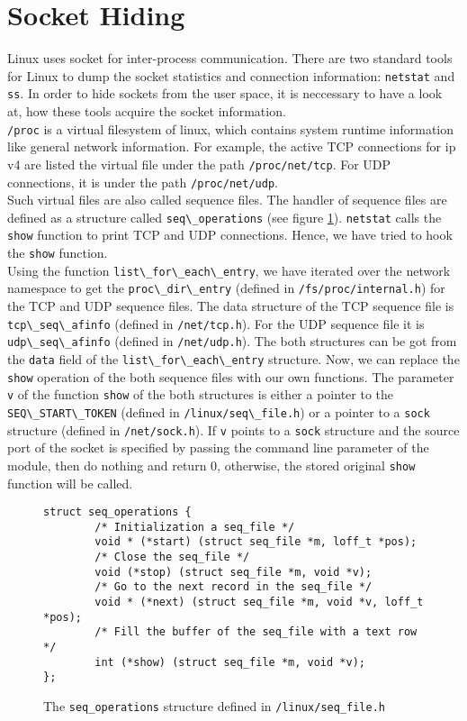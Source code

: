 \section{Socket Hiding}
Linux uses socket for inter-process communication. There are two standard tools for Linux to dump the socket statistics and connection information: \texttt{netstat} and \texttt{ss}. In order to hide sockets from the user space, it is neccessary to have a look at, how these tools acquire the socket information. \\
\verb+/proc+ is a virtual filesystem of linux, which contains system runtime information like general network information. For example, the active TCP connections for ip v4 are listed the virtual file under the path \verb+/proc/net/tcp+. For UDP connections, it is under the path \verb+/proc/net/udp+.\\
Such virtual files are also called sequence files. The handler of sequence files are defined as a structure called \verb+seq\_operations+ (see figure \ref{ls:op}). \verb+netstat+ calls the \verb+show+ function to print TCP and UDP connections. Hence, we have tried to hook the \verb+show+ function.\\
Using the function \verb+list\_for\_each\_entry+, we have iterated over the network namespace to get the \verb+proc\_dir\_entry+ (defined in \verb+/fs/proc/internal.h+) for the TCP and UDP sequence files. The data structure of the TCP sequence file is \verb+tcp\_seq\_afinfo+ (defined in \verb+/net/tcp.h+). For the UDP sequence file it is \verb+udp\_seq\_afinfo+ (defined in \verb+/net/udp.h+). The both structures can be got from the \verb+data+ field of the \verb+list\_for\_each\_entry+ structure. Now, we can replace the \verb+show+ operation of the both sequence files with our own functions. The parameter \verb+v+ of the function \verb+show+ of the both structures is either a pointer to the \verb+SEQ\_START\_TOKEN+ (defined in \verb+/linux/seq\_file.h+) or a pointer to a \verb+sock+ structure (defined in \verb+/net/sock.h+). If \verb+v+ points to a \verb+sock+ structure and the source port of the socket is specified by passing the command line parameter of the module, then do nothing and return 0, otherwise, the stored original \verb+show+ function will be called.
\begin{center}
\begin{figure}
\lstset{escapechar=,style=customc}
\begin{lstlisting}
struct seq_operations {
		/* Initialization a seq_file */		
		void * (*start) (struct seq_file *m, loff_t *pos);
		/* Close the seq_file */
		void (*stop) (struct seq_file *m, void *v);
		/* Go to the next record in the seq_file */
		void * (*next) (struct seq_file *m, void *v, loff_t *pos);
		/* Fill the buffer of the seq_file with a text row */
		int (*show) (struct seq_file *m, void *v);
};
\end{lstlisting}
\caption{The \texttt{seq\_operations} structure defined in \texttt{/linux/seq\_file.h}}
\label{ls:op}
\end{figure}
\end{center}
